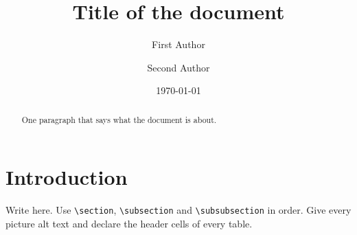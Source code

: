\documentclass{article}
\title{Title of the document}
\author{First Author \and Second Author}
\date{\today}
\begin{document}
\maketitle

\begin{abstract}
One paragraph that says what the document is about.
\end{abstract}


\section{Introduction}
Write here. Use \verb|\section|, \verb|\subsection| and \verb|\subsubsection| in order.
Give every picture alt text and declare the header cells of every table.

\printendnotes
% 
% 
\end{document}
